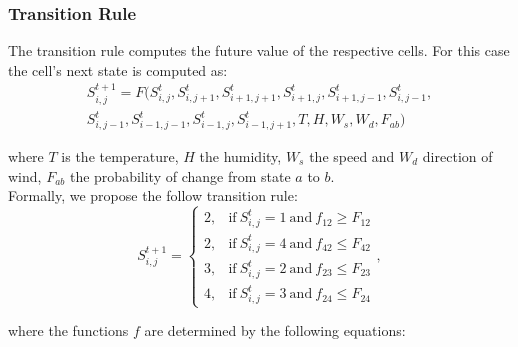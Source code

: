 \documentclass[conference]{IEEEtran}
\begin{document}
        
        \subsubsection{Transition Rule}
        
            The transition rule computes the future value of the respective cells. For this case
            the cell’s next state is computed as: 
            \begin{equation}
                \begin{split}
                    S_{i,j}^{t+1} = F(S_{i,j}^t,S_{i,j+1}^t, S_{i+1,j+1}^t,S_{i+1,j}^t, S_{i+1,j-1}^t, S_{i,j-1}^t, \\ \nonumber
                    S_{i,j-1}^t, S_{i-1,j-1}^t, S_{i-1,j}^t, S_{i-1,j+1}^t, T, H, W_s, W_d, F_{ab})
                \end{split}                
            \end{equation}
            
            where $T$ is the temperature, $H$ the humidity, $W_s$ the speed and $W_d$ direction of wind, $F_{ab}$ the 
            probability of change from state $a$ to $b$. \\
            
            Formally, we propose the follow transition rule:
            \begin{equation}
                S_{i,j}^{t+1} =
                \begin{cases}
                    2, & \text{if} ~ S_{i,j}^{t} = 1 ~ \text{and} ~ f_{12} \geq F_{12} \\
                    2, & \text{if} ~ S_{i,j}^{t} = 4 ~ \text{and} ~ f_{42} \leq F_{42} \\
                    3, & \text{if} ~ S_{i,j}^{t} = 2 ~ \text{and} ~ f_{23} \leq F_{23} \\
                    4, & \text{if} ~ S_{i,j}^{t} = 3 ~ \text{and} ~ f_{24} \leq F_{24}
                \end{cases},
                \label{eq:transition_rule}
            \end{equation}
            
            where the functions $f$ are determined by the following equations:
            
\end{document}
